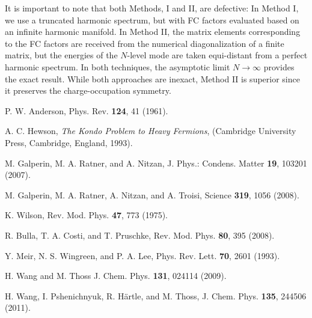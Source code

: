 \documentclass[aps,pra,twocolumn,groupedaddress,showpacs,superscriptaddress,amssymb,amsmath]{revtex4-1}
\begin{document}
It is important to note that both Methods, I and II, are defective:
In Method I, we use a truncated harmonic spectrum, but with FC factors evaluated based on an infinite harmonic manifold.
In Method II,  the matrix elements corresponding to the FC factors
are received from the numerical diagonalization of a finite matrix, 
but the energies of the $N$-level mode are taken equi-distant from a perfect harmonic spectrum.
In both techniques, the asymptotic limit $N\rightarrow \infty$ provides the exact result. 
While both approaches are inexact, %
Method II is superior since it preserves the charge-occupation symmetry.

\begin{thebibliography}{0}


P. W. Anderson, Phys. Rev. {\bf 124}, 41 (1961).

A. C. Hewson, {\it The Kondo Problem to Heavy Fermions}, (Cambridge
University Press, Cambridge, England, 1993).

M. Galperin, M. A. Ratner, and A. Nitzan, J. Phys.: Condens. Matter {\bf 19}, 103201 (2007).

M. Galperin, M. A. Ratner, A. Nitzan, and A. Troisi,
Science {\bf 319}, 1056 (2008).

K. Wilson, Rev. Mod. Phys. {\bf 47}, 773 (1975).

R. Bulla, T. A. Costi, and T. Pruschke, Rev. Mod. Phys. {\bf 80}, 395 (2008).

Y. Meir, N. S. Wingreen, and P. A. Lee, Phys. Rev. Lett. {\bf 70}, 2601 (1993).

H. Wang and M. Thoss
J. Chem. Phys. {\bf 131}, 024114 (2009).

H. Wang, I. Pshenichnyuk, R. H\"artle, and M. Thoss,
J. Chem. Phys.  {\bf 135}, 244506  (2011).


\end{thebibliography}
\end{document}
